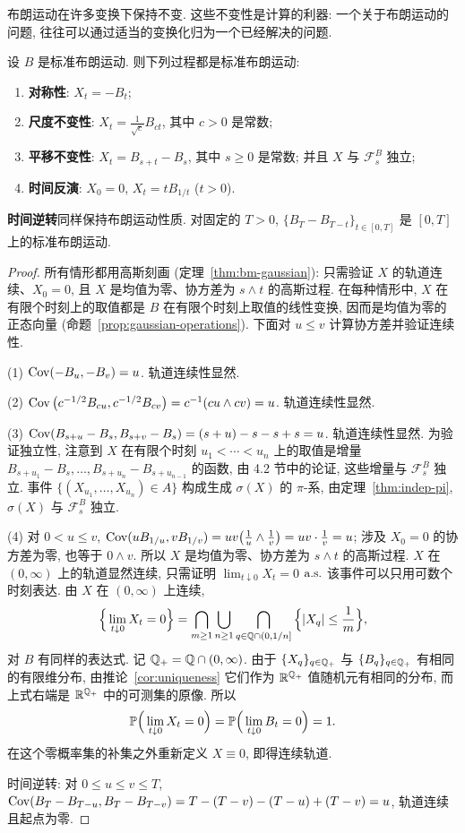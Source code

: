 布朗运动在许多变换下保持不变. 这些不变性是计算的利器: 一个关于布朗运动的问题, 往往可以通过适当的变换化归为一个已经解决的问题.

\begin{theorem}[不变性]\label{thm:bm-invariance}
设 $B$ 是标准布朗运动. 则下列过程都是标准布朗运动:
\begin{enumerate}
\item \textbf{对称性}: $X_t=-B_t$;
\item \textbf{尺度不变性}: $X_t=\frac{1}{\sqrt{c}}B_{ct}$, 其中 $c>0$ 是常数;
\item \textbf{平移不变性}: $X_t=B_{s+t}-B_s$, 其中 $s\ge0$ 是常数; 并且 $X$ 与 $\mathcal{F}^B_s$ 独立;
\item \textbf{时间反演}: $X_0=0$, $X_t=tB_{1/t}$ ($t>0$).
\end{enumerate}
\textbf{时间逆转}同样保持布朗运动性质. 对固定的 $T>0$, $\{B_T-B_{T-t}\}_{t\in[0,T]}$ 是 $[0,T]$ 上的标准布朗运动.
\end{theorem}

\begin{proof}
所有情形都用高斯刻画 (定理~\ref{thm:bm-gaussian}): 只需验证 $X$ 的轨道连续、$X_0=0$, 且 $X$ 是均值为零、协方差为 $s\wedge t$ 的高斯过程. 在每种情形中, $X$ 在有限个时刻上的取值都是 $B$ 在有限个时刻上取值的线性变换, 因而是均值为零的正态向量 (命题~\ref{prop:gaussian-operations}). 下面对 $u\le v$ 计算协方差并验证连续性.

(1) $\Cov(-B_u,-B_v)=u$. 轨道连续性显然.

(2) $\Cov\big(c^{-1/2}B_{cu},c^{-1/2}B_{cv}\big)=c^{-1}(cu\wedge cv)=u$. 轨道连续性显然.

(3) $\Cov(B_{s+u}-B_s,B_{s+v}-B_s)=(s+u)-s-s+s=u$. 轨道连续性显然. 为验证独立性, 注意到 $X$ 在有限个时刻 $u_1<\cdots<u_n$ 上的取值是增量 $B_{s+u_1}-B_s,\dots,B_{s+u_n}-B_{s+u_{n-1}}$ 的函数, 由 4.2 节中的论证, 这些增量与 $\mathcal{F}^B_s$ 独立. 事件 $\{(X_{u_1},\dots,X_{u_n})\in A\}$ 构成生成 $\sigma(X)$ 的 $\pi$-系, 由定理~\ref{thm:indep-pi}, $\sigma(X)$ 与 $\mathcal{F}^B_s$ 独立.

(4) 对 $0<u\le v$, $\Cov(uB_{1/u},vB_{1/v})=uv\big(\frac{1}{u}\wedge\frac{1}{v}\big)=uv\cdot\frac{1}{v}=u$; 涉及 $X_0=0$ 的协方差为零, 也等于 $0\wedge v$. 所以 $X$ 是均值为零、协方差为 $s\wedge t$ 的高斯过程. $X$ 在 $(0,\infty)$ 上的轨道显然连续, 只需证明 $\lim_{t\downarrow0}X_t=0$ $\as$ 该事件可以只用可数个时刻表达. 由 $X$ 在 $(0,\infty)$ 上连续,
\[
\Big\{\lim_{t\downarrow0}X_t=0\Big\}=\bigcap_{m\ge1}\bigcup_{n\ge1}\bigcap_{q\in\Q\cap(0,1/n]}\Big\{\abs{X_q}\le\frac{1}{m}\Big\},
\]
对 $B$ 有同样的表达式. 记 $\Q_+=\Q\cap(0,\infty)$. 由于 $\{X_q\}_{q\in\Q_+}$ 与 $\{B_q\}_{q\in\Q_+}$ 有相同的有限维分布, 由推论~\ref{cor:uniqueness} 它们作为 $\R^{\Q_+}$ 值随机元有相同的分布, 而上式右端是 $\R^{\Q_+}$ 中的可测集的原像. 所以
\[
\P\Big(\lim_{t\downarrow0}X_t=0\Big)=\P\Big(\lim_{t\downarrow0}B_t=0\Big)=1.
\]
在这个零概率集的补集之外重新定义 $X\equiv0$, 即得连续轨道.

时间逆转: 对 $0\le u\le v\le T$, $\Cov(B_T-B_{T-u},B_T-B_{T-v})=T-(T-v)-(T-u)+(T-v)=u$, 轨道连续且起点为零.
\end{proof}

